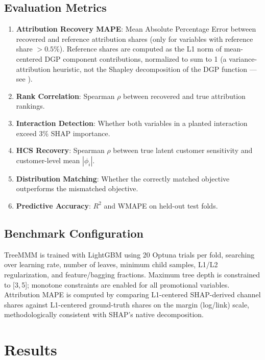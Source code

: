 \documentclass[review,12pt]{elsarticle}
\begin{document}
\subsection{Evaluation Metrics}
\label{sec:design:metrics}

\begin{enumerate}
\item \textbf{Attribution Recovery MAPE}: Mean Absolute Percentage Error
  between recovered and reference attribution shares (only for variables with
  reference share $> 0.5$\%). Reference shares are computed as the L1 norm of
  mean-centered DGP component contributions, normalized to sum to 1 (a
  variance-attribution heuristic, not the Shapley decomposition of the DGP
  function --- see ).
\item \textbf{Rank Correlation}: Spearman $\rho$ between recovered and true
  attribution rankings.
\item \textbf{Interaction Detection}: Whether both variables in a planted
  interaction exceed 3\% SHAP importance.
\item \textbf{HCS Recovery}: Spearman $\rho$ between true latent customer
  sensitivity and customer-level mean $|\phi_i|$.
\item \textbf{Distribution Matching}: Whether the correctly matched objective
  outperforms the mismatched objective.
\item \textbf{Predictive Accuracy}: $R^2$ and WMAPE on held-out test folds.
\end{enumerate}

\subsection{Benchmark Configuration}
\label{sec:design:config}

TreeMMM is trained with LightGBM \cite{ke2017lightgbm} using 20 Optuna trials
per fold, searching over learning rate, number of leaves, minimum child
samples, L1/L2 regularization, and feature/bagging fractions. Maximum tree
depth is constrained to [3,\,5]; monotone constraints are enabled for all
promotional variables. Attribution MAPE is computed by comparing L1-centered
SHAP-derived channel shares against L1-centered ground-truth shares on the
margin (log/link) scale, methodologically consistent with SHAP's native
decomposition.

\section{Results}
\label{sec:results}
\end{document}
